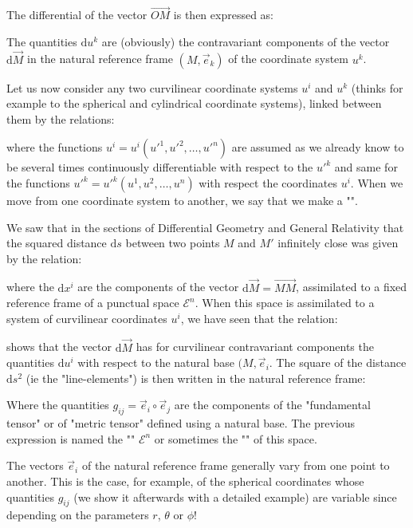 	The differential of the vector $\overrightarrow{OM}$ is then expressed as:
	
	The quantities $\mathrm{d}u^k$ are (obviously) the contravariant components of the vector $\mathrm{d}\vec{M}$ in the natural reference frame $(M,\vec{e}_k)$ of the coordinate system $u^k$.
	
	Let us now consider any two curvilinear coordinate systems $u^i$ and $u^k$ (thinks for example to the spherical and cylindrical coordinate systems), linked between them by the relations:
	
	where the functions $u^i=u^i({u'}^1,{u'}^2,\ldots,{u'}^n)$ are assumed as we already know to be several times continuously differentiable with respect to the ${u'}^k$ and same for the functions ${u'}^k={u'}^k(u^1,u^2,\ldots,u^n)$ with respect the coordinates $u^i$. When we move from one coordinate system to another, we say that we make a "".
	
	We saw that in the sections of Differential Geometry and General Relativity that the squared distance $\mathrm{d}s$ between two points $M$ and $M'$ infinitely close was given by the relation:
	
	where the $\mathrm{d}x^i$ are the components of the vector $\mathrm{d}\vec{M}=\overrightarrow{MM}$, assimilated to a fixed reference frame of a punctual space $\mathcal{E}^n$. When this space is assimilated to a system of curvilinear coordinates $u^i$, we have seen that the relation:
	
	shows that the vector $\mathrm{d}\vec{M}$ has for curvilinear contravariant components the quantities $\mathrm{d}u^i$ with respect to the natural base $(M,\vec{e}_i$. The square of the distance $\mathrm{d}s^2$ (ie the "line-elements") is then written in the natural reference frame:
	
	Where the quantities $g_{ij}=\vec{e}_i\circ\vec{e}_j$ are the components of the "fundamental tensor" or of "metric tensor" defined using a natural base. The previous expression is named the  "" $\mathcal{E}^n$ or sometimes the "" of this space.
	
	The vectors $\vec{e}_i$ of the natural reference frame generally vary from one point to another. This is the case, for example, of the spherical coordinates whose quantities $g_{ij}$ (we show it afterwards with a detailed example) are variable since depending on the parameters $r$, $\theta$ or $\phi$!
	
